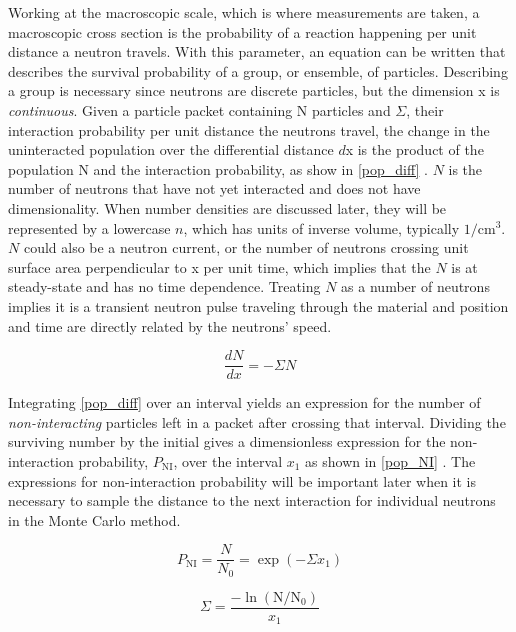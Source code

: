 Working at the macroscopic scale, which is where measurements are taken, a macroscopic cross section is the probability of a reaction happening per unit distance a neutron travels.  With this parameter, an equation can be written that describes the survival probability of a group, or ensemble, of particles.  Describing a group is necessary since neutrons are discrete particles, but the dimension x is \emph{continuous}.  Given a particle packet containing N particles and $\Sigma$, their interaction probability per unit distance the neutrons travel, the change in the uninteracted population over the differential distance $d$x is the product of the population N and the interaction probability, as show in \eqref{pop_diff} \cite{duderstadt}.  $N$ is the number of neutrons that have not yet interacted and does not have dimensionality.  When number densities are discussed later, they will be represented by a lowercase $n$, which has units of inverse volume, typically $1/\mathrm{cm}^3$.  $N$ could also be a neutron current, or the number of neutrons crossing unit surface area perpendicular to x per unit time, which implies that the $N$ is at steady-state and has no time dependence.  Treating $N$ as a number of neutrons implies it is a transient neutron pulse traveling through the material and position and time are directly related by the neutrons' speed.

\begin{equation}
\frac{d N}{d x} = - \Sigma N
\label{pop_diff}
\end{equation}

Integrating \eqref{pop_diff} over an interval yields an expression for the number of \emph{non-interacting} particles left in a packet after crossing that interval.  Dividing the surviving number by the initial gives a dimensionless expression for the non-interaction probability, $P_\mathrm{NI}$, over the interval $x_1$ as shown in \eqref{pop_NI} \cite{duderstadt}.  The expressions for non-interaction probability will be important later when it is necessary to sample the distance to the next interaction for individual neutrons in the Monte Carlo method.

\begin{equation}
P_\mathrm{NI} = \frac{N}{N_0} = \exp \left(- \Sigma x_1 \right)
\label{pop_NI}
\end{equation}

\begin{equation}
\Sigma = \frac{ - \ln \left(    \mathrm{N} / \mathrm{N}_0  \right )  }  {x_1}
\label{pop_beam}
\end{equation}

